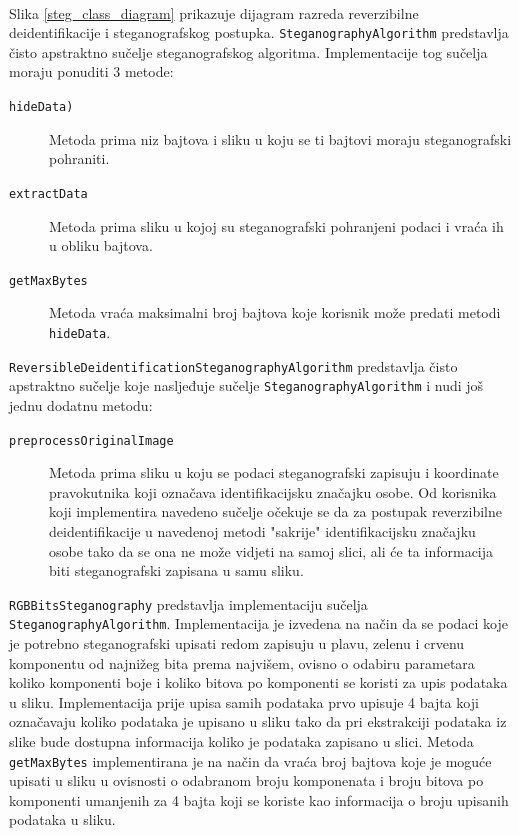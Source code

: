 \documentclass[times, utf8, seminar]{fer}
\begin{document}
\paragraph{}
Slika \ref{steg_class_diagram} prikazuje dijagram razreda reverzibilne deidentifikacije i steganografskog postupka. \texttt{SteganographyAlgorithm} predstavlja čisto apstraktno sučelje steganografskog algoritma. Implementacije tog sučelja moraju ponuditi 3 metode:
\begin{description}
\item[\texttt{hideData)}] Metoda prima niz bajtova i sliku u koju se ti bajtovi moraju steganografski pohraniti.
\item[\texttt{extractData}] Metoda prima sliku u kojoj su steganografski pohranjeni podaci i vraća ih u obliku bajtova.
\item[\texttt{getMaxBytes}] Metoda vraća maksimalni broj bajtova koje korisnik može predati metodi \texttt{hideData}.
\end{description}

\texttt{ReversibleDeidentificationSteganographyAlgorithm} predstavlja čisto apstraktno sučelje koje nasljeđuje sučelje \texttt{SteganographyAlgorithm} i nudi još jednu dodatnu metodu:
\begin{description}
\item[\texttt{preprocessOriginalImage}] Metoda prima sliku u koju se podaci steganografski zapisuju i koordinate pravokutnika koji označava identifikacijsku značajku osobe. Od korisnika koji implementira navedeno sučelje očekuje se da za postupak reverzibilne deidentifikacije u navedenoj metodi "sakrije" identifikacijsku značajku osobe tako da se ona ne može vidjeti na samoj slici, ali će ta informacija biti steganografski zapisana u samu sliku.
\end{description}

\texttt{RGBBitsSteganography} predstavlja implementaciju sučelja \texttt{SteganographyAlgorithm}. Implementacija je izvedena na način da se podaci koje je potrebno steganografski upisati redom zapisuju u plavu, zelenu i crvenu komponentu od najnižeg bita prema najvišem, ovisno o odabiru parametara koliko komponenti boje i koliko bitova po komponenti se koristi za upis podataka u sliku. Implementacija prije upisa samih podataka prvo upisuje 4 bajta koji označavaju koliko podataka je upisano u sliku tako da pri ekstrakciji podataka iz slike bude dostupna informacija koliko je podataka zapisano u slici. Metoda \texttt{getMaxBytes} implementirana je na način da vraća broj bajtova koje je moguće upisati u sliku u ovisnosti o odabranom broju komponenata i broju bitova po komponenti umanjenih za 4 bajta koji se koriste kao informacija o broju upisanih podataka u sliku.
\end{document}
